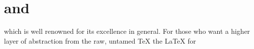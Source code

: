 \section{\protect{\TeX} and \protect{\LaTeX}}
\label{sec:tex-and-latex}

which is well renowned for its excellence in general.  For those who
want a higher layer of abstraction from the raw, untamed {\TeX} the
{\LaTeX} 
for 

